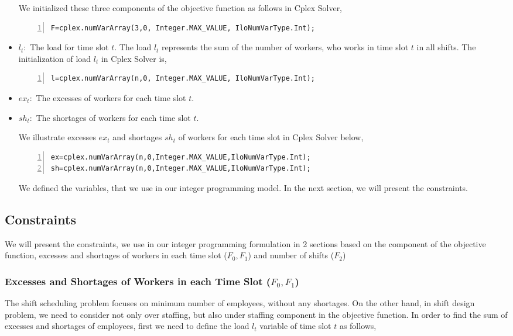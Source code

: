\begin{itemize}
We initialized these three components of the objective function as follows in Cplex Solver,

\begin{lstlisting}[frame=single, numbers=left]
F=cplex.numVarArray(3,0, Integer.MAX_VALUE, IloNumVarType.Int);
\end{lstlisting}

\item $l_t : $ The load for time slot $t$. The load $l_t$ represents the sum of the number of workers, who works in time slot $t$ in all shifts. The initialization of load $l_t$ in Cplex Solver is,

\begin{lstlisting}[frame=single, numbers=left]
l=cplex.numVarArray(n,0, Integer.MAX_VALUE, IloNumVarType.Int);
\end{lstlisting}


\item $ex_t : $ The excesses of workers for each time slot $t$.

\item $sh_t : $ The shortages of workers  for each time slot $t$.

We illustrate excesses $ex_t$ and shortages $sh_t $ of workers for each time slot in Cplex Solver below,
\begin{lstlisting}[frame=single, numbers=left]
ex=cplex.numVarArray(n,0,Integer.MAX_VALUE,IloNumVarType.Int);
sh=cplex.numVarArray(n,0,Integer.MAX_VALUE,IloNumVarType.Int);
\end{lstlisting}

We defined the variables, that we use in our integer programming model. In the next section, we will present the constraints.

\end{itemize}


\subsection{Constraints}
We will present the constraints, we use in our integer programming formulation in 2 sections based on the component of the objective function, excesses and shortages of workers in each time slot ($F_0, F_1 $) and number of shifts ($F_2$)

\subsubsection{Excesses and Shortages of Workers in each Time Slot ($F_0 , F_1 $)}
The shift scheduling problem focuses on minimum number of employees, without any shortages. On the other hand, in shift design problem, we need to consider not only over staffing, but also under staffing component in the objective function. In order to find the sum of excesses and shortages of employees, first we need to define the load $l_t$ variable of time slot $t$ as follows,

